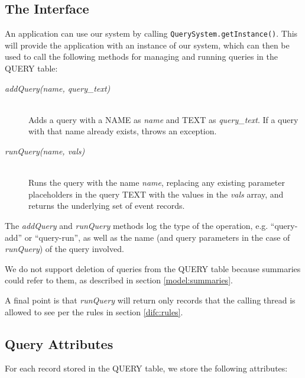 \subsection{The Interface}
\label{model:query-system}

An application can use our system by calling \lstinline$QuerySystem.getInstance()$. This will provide the application with an instance of our system, which can then be used to call the following methods for managing and running queries in the QUERY table:
\begin{description}
  \item[\emph{addQuery(name, query\_text)}] \ \\
    Adds a query with a NAME as \emph{name}
    and TEXT as \emph{query\_text}. If a query with that
    name already exists, throws an exception.
  \item[\emph{runQuery(name, vals)}] \ \\
    Runs the query with the name \emph{name}, 
    replacing any existing
    parameter placeholders in the query TEXT with
    the values in the \emph{vals} array, and 
    returns the underlying set of event records.
\end{description}

\noindent
The \emph{addQuery} and \emph{runQuery} methods log the type of the operation, e.g. ``query-add'' or ``query-run'', as well as the name (and query parameters in the case of \emph{runQuery}) of the query involved.

We do not support deletion of queries from the QUERY table because summaries could refer to them, as described in section \ref{model:summaries}.

A final point is that \emph{runQuery} will return only records that the calling thread is allowed to see per the rules in section \ref{difc:rules}.

\subsection{Query Attributes}

For each record stored in the QUERY table, we store the following attributes:

